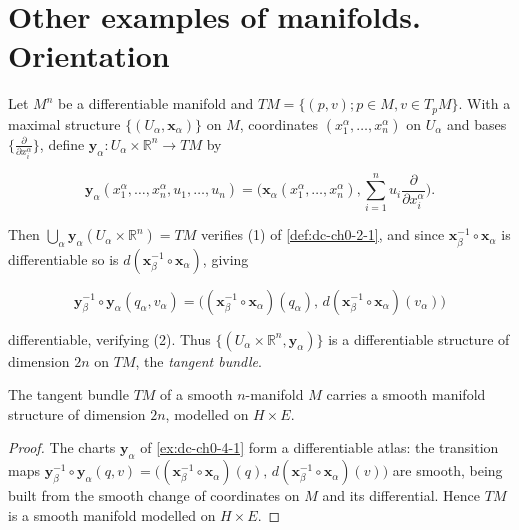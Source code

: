 \section{Other examples of manifolds. Orientation}

\begin{example}
  \label{ex:dc-ch0-4-1}
  \leanok
  Let $M^n$ be a differentiable manifold and $TM=\{(p,v); p\in M, v\in T_pM\}$. With
  a maximal structure $\{(U_\alpha,\mathbf{x}_\alpha)\}$ on $M$, coordinates
  $(x_1^\alpha,\dots,x_n^\alpha)$ on $U_\alpha$ and bases
  $\{\frac{\partial}{\partial x_i^\alpha}\}$, define
  $\mathbf{y}_\alpha:U_\alpha\times\mathbb{R}^n\to TM$ by
  
  $$
  \mathbf{y}_\alpha(x_1^\alpha,\dots,x_n^\alpha,u_1,\dots,u_n)=\Big(\mathbf{x}_\alpha(x_1^\alpha,\dots,x_n^\alpha),\sum_{i=1}^n u_i\frac{\partial}{\partial x_i^\alpha}\Big).
  $$
  
  Then $\bigcup_\alpha\mathbf{y}_\alpha(U_\alpha\times\mathbb{R}^n)=TM$ verifies (1)
  of \cref{def:dc-ch0-2-1}, and since $\mathbf{x}_\beta^{-1}\circ\mathbf{x}_\alpha$ is
  differentiable so is $d(\mathbf{x}_\beta^{-1}\circ\mathbf{x}_\alpha)$, giving
  
  $$
  \mathbf{y}_\beta^{-1}\circ\mathbf{y}_\alpha(q_\alpha,v_\alpha)=\big((\mathbf{x}_\beta^{-1}\circ\mathbf{x}_\alpha)(q_\alpha),\,d(\mathbf{x}_\beta^{-1}\circ\mathbf{x}_\alpha)(v_\alpha)\big)
  $$
  
  differentiable, verifying (2). Thus $\{(U_\alpha\times\mathbb{R}^n,\mathbf{y}_\alpha)\}$
  is a differentiable structure of dimension $2n$ on $TM$, the \emph{tangent bundle}.
\end{example}

\begin{lemma}
  \label{lem:dc-ch0-4-1-manifold}
  \leanok
  The tangent bundle $TM$ of a smooth $n$-manifold $M$ carries a smooth manifold
  structure of dimension $2n$, modelled on $H\times E$.
\end{lemma}
\begin{proof}
  \sketch
  \leanok
  The charts $\mathbf{y}_\alpha$ of \cref{ex:dc-ch0-4-1} form a differentiable
  atlas: the transition maps
  $\mathbf{y}_\beta^{-1}\circ\mathbf{y}_\alpha(q,v)=\big((\mathbf{x}_\beta^{-1}\circ\mathbf{x}_\alpha)(q),\,d(\mathbf{x}_\beta^{-1}\circ\mathbf{x}_\alpha)(v)\big)$
  are smooth, being built from the smooth change of coordinates on $M$ and its
  differential. Hence $TM$ is a smooth manifold modelled on $H\times E$.
\end{proof}

